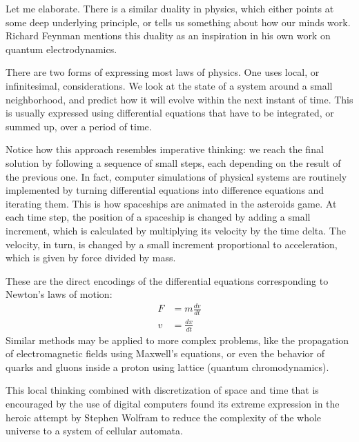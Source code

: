 Let me elaborate. There is a similar duality in physics, which either
points at some deep underlying principle, or tells us something about
how our minds work. Richard Feynman mentions this duality as an
inspiration in his own work on quantum electrodynamics.

There are two forms of expressing most laws of physics. One uses local,
or infinitesimal, considerations. We look at the state of a system
around a small neighborhood, and predict how it will evolve within the
next instant of time. This is usually expressed using differential
equations that have to be integrated, or summed up, over a period of
time.

Notice how this approach resembles imperative thinking: we reach the
final solution by following a sequence of small steps, each depending on
the result of the previous one. In fact, computer simulations of
physical systems are routinely implemented by turning differential
equations into difference equations and iterating them. This is how
spaceships are animated in the asteroids game. At each time step, the
position of a spaceship is changed by adding a small increment, which is
calculated by multiplying its velocity by the time delta. The velocity,
in turn, is changed by a small increment proportional to acceleration,
which is given by force divided by mass.

These are the direct encodings of the differential equations
corresponding to Newton's laws of motion:
\begin{align*}
F &= m \frac{dv}{dt} \\
v &= \frac{dx}{dt}
\end{align*}
Similar methods may be applied to more complex problems, like the
propagation of electromagnetic fields using Maxwell's equations, or even
the behavior of quarks and gluons inside a proton using lattice 
(quantum chromodynamics).

This local thinking combined with discretization of space and time that
is encouraged by the use of digital computers found its extreme
expression in the heroic attempt by Stephen Wolfram to reduce the
complexity of the whole universe to a system of cellular automata.

